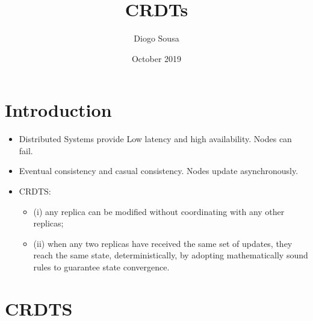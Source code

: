 \documentclass{article}
\title{CRDTs}
\author{Diogo Sousa}
\date{October 2019}
\begin{document}
\maketitle

\section{Introduction}
\begin{itemize}
    \item Distributed Systems provide Low latency and high availability. Nodes can fail.
    \item Eventual consistency and casual consistency. Nodes update asynchronously.
    \item CRDTS:
    \begin{itemize}
        \item (i) any replica can be modified without coordinating with any other replicas;
        \item (ii) when any two replicas have received the same set of updates, they reach
the same state, deterministically, by adopting mathematically sound rules
to guarantee state convergence.
    \end{itemize}
\end{itemize}
\section{CRDTS}
\end{document}
